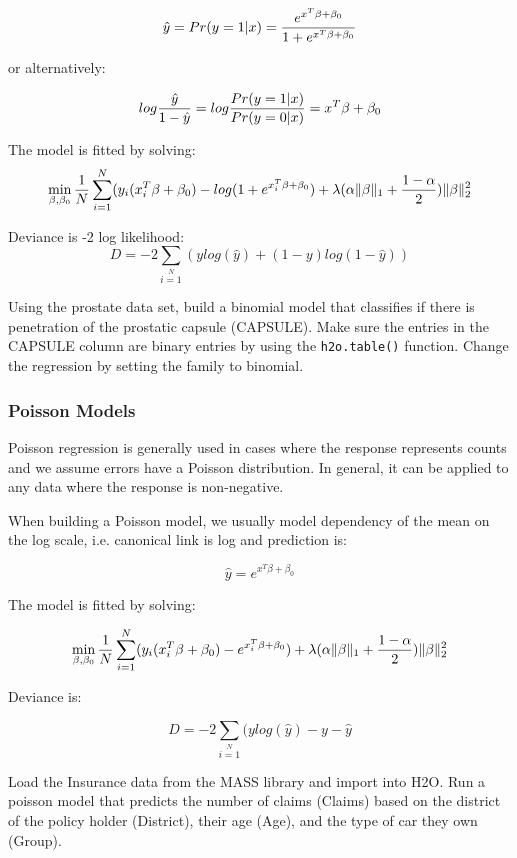 \[ \hat{y} = Pr(y = 1|x) = {e^{x^T\beta + \beta_0} \over 1 + e^{x^T \beta + \beta_0} } \]

or alternatively:

\[log {\hat{y} \over 1- \hat{y}} = log{Pr(y=1|x) \over Pr(y=0|x)} = x^T \beta + \beta_0\]

The model is fitted by solving:
\[  \min\limits_{\beta,\beta_0} { {1 \over N}\sum\limits_{i=1}\limits^{N}(y_i (x_i^{T}\beta  + \beta_0) - log (1 + e^{x_i^{T}\beta  + \beta_0} )  + \lambda (\alpha \|\beta \|_1 + {1-\alpha \over 2}) \| \beta \|_2^2} \]

Deviance is -2 log likelihood:
\[D = -2\sum\limits_{i=1}\limits^{N}{(y log(\hat{y}) + (1 - y)log(1-\hat{y})  )}\]

\waterExampleInR

Using the prostate data set, build a binomial model that classifies if there is penetration of the prostatic
capsule (CAPSULE). Make sure the entries in the CAPSULE column are binary entries by using the \texttt{h2o.table()}
function. Change the regression by setting the family to binomial.



\subsubsection{Poisson Models}
Poisson regression is generally used in cases where the response represents counts and we assume errors have a
Poisson distribution. In general, it can be applied to any data where the response is non-negative.

When building a Poisson model, we usually model dependency of the mean on the log scale, i.e. canonical link is log
and prediction is:

\[\hat{y} = e^{x^T\beta + \beta_0}\]

The model is fitted by solving:

\[  \min\limits_{\beta,\beta_0} { {1 \over N}\sum\limits_{i=1}\limits^{N}(y_i (x_i^{T}\beta  + \beta_0) - e^{x_i^{T}\beta  + \beta_0})  + \lambda (\alpha \|\beta \|_1 + {1-\alpha \over 2}) \| \beta \|_2^2} \]

Deviance is:

\[D = -2\sum\limits_{i=1}\limits^{N}{(y log(\hat{y}) - y - \hat{y}}\]

\waterExampleInR

Load the Insurance data from the MASS library and import into H2O. Run a poisson model that predicts the number of
claims (Claims) based on the district of the policy holder (District), their age (Age), and the type of car they
own (Group).

